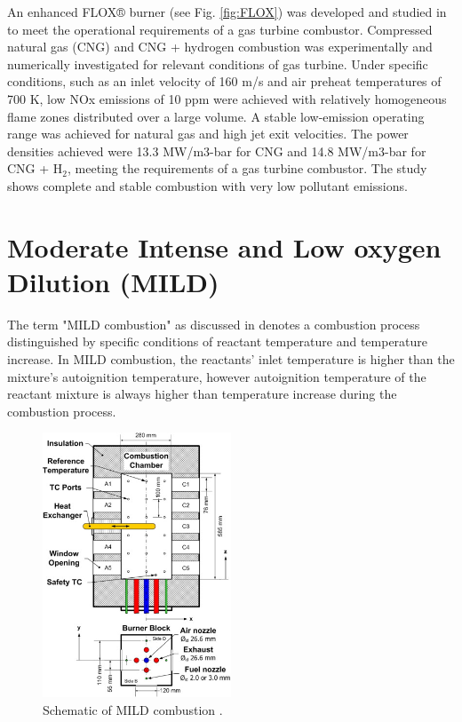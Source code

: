 An enhanced FLOX® burner (see Fig. \ref{fig:FLOX}) was developed and studied in \cite{LAMMEL4001825} to meet the operational requirements of a gas turbine combustor. Compressed natural gas (CNG) and CNG + hydrogen combustion was experimentally and numerically investigated for relevant conditions of gas turbine. Under specific conditions, such as an inlet velocity of 160 m/s and air preheat temperatures of 700 K, low NOx emissions of 10 ppm were achieved with relatively homogeneous flame zones distributed over a large volume. A stable low-emission operating range was achieved for natural gas and high jet exit velocities.  The power densities achieved were 13.3 MW/m3-bar for CNG and 14.8 MW/m3-bar for CNG + H$_2$, meeting the requirements of a gas turbine combustor. The study shows complete and stable combustion with very low pollutant emissions.

\section{Moderate Intense and Low oxygen Dilution (MILD)}

The term "MILD combustion" as discussed in \cite{CAVALIERE2004329} denotes a combustion process distinguished by specific conditions of reactant temperature and temperature increase.  In MILD combustion, the reactants' inlet temperature is higher than the mixture's autoignition temperature, however autoignition temperature of the reactant mixture is always higher than temperature increase during the combustion process.

\begin{figure}
    \centering
    \includegraphics[width=0.5\textwidth]{Chapter2/Images/MILD.jpg}
    \caption[Schematic of MILD combustion]{Schematic of MILD combustion \cite{SZEGO2009429}.}
    \label{fig:MILD}
\end{figure}


